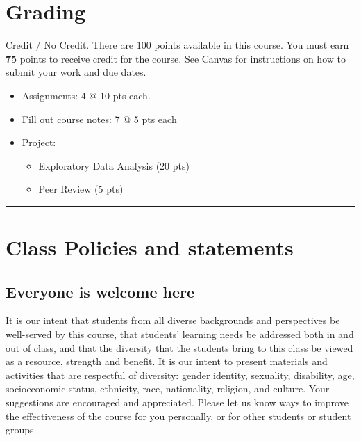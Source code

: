 \documentclass[
  11pt,
]{article}
\providecommand{\tightlist}{%
  \setlength{\itemsep}{0pt}\setlength{\parskip}{0pt}}
\begin{document}
\hypertarget{grading}{%
\section{Grading}\label{grading}}

Credit / No Credit. There are 100 points available in this course. You
must earn \textbf{75} points to receive credit for the course. See
Canvas for instructions on how to submit your work and due dates.

\begin{itemize}
\tightlist
\item
  Assignments: 4 @ 10 pts each.
\item
  Fill out course notes: 7 @ 5 pts each
\item
  Project:

  \begin{itemize}
  \tightlist
  \item
    Exploratory Data Analysis (20 pts)
  \item
    Peer Review (5 pts)
  \end{itemize}
\end{itemize}

\begin{center}\rule{0.5\linewidth}{0.5pt}\end{center}

\hypertarget{class-policies-and-statements}{%
\section{Class Policies and
statements}\label{class-policies-and-statements}}

\hypertarget{everyone-is-welcome-here}{%
\subsection{Everyone is welcome here}\label{everyone-is-welcome-here}}

It is our intent that students from all diverse backgrounds and
perspectives be well-served by this course, that students' learning
needs be addressed both in and out of class, and that the diversity that
the students bring to this class be viewed as a resource, strength and
benefit. It is our intent to present materials and activities that are
respectful of diversity: gender identity, sexuality, disability, age,
socioeconomic status, ethnicity, race, nationality, religion, and
culture. Your suggestions are encouraged and appreciated. Please let us
know ways to improve the effectiveness of the course for you personally,
or for other students or student groups.
\end{document}
